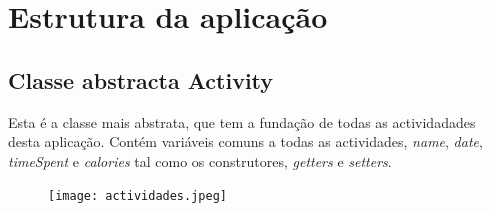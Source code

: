 \documentclass[10pt,notitlepage]{article}
\begin{document}
\section{Estrutura da aplicação}

\subsection{Classe abstracta Activity}

Esta é a classe mais abstrata, que tem a fundação de todas as actividadades desta aplicação. Contém variáveis comuns a todas as actividades, \textit{name}, \textit{date}, \textit{timeSpent} e \textit{calories} tal como os construtores, \textit{getters} e  \textit{setters}.

\begin{figure}[h]
\centering
\texttt{[image: actividades.jpeg]}
\end{figure}
\end{document}
